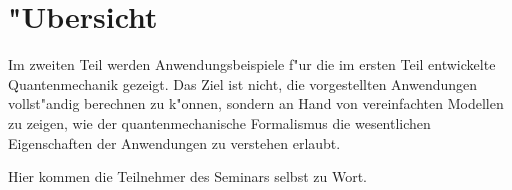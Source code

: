 \chapter*{"Ubersicht}
\rhead{}
Im zweiten Teil werden Anwendungsbeispiele f"ur die im ersten
Teil entwickelte Quantenmechanik gezeigt.
Das Ziel ist nicht, die vorgestellten Anwendungen vollst"andig
berechnen zu k"onnen, sondern an Hand von vereinfachten Modellen
zu zeigen, wie der quantenmechanische Formalismus die wesentlichen
Eigenschaften der Anwendungen zu verstehen erlaubt.

Hier kommen die Teilnehmer des Seminars selbst zu Wort.

